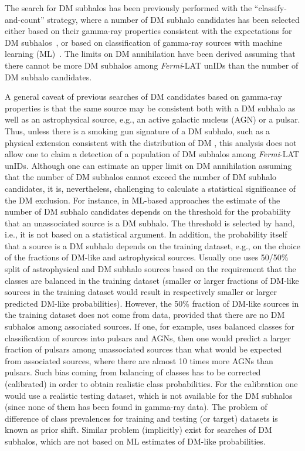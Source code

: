 \documentclass[12pt, a4paper]{article}
\newcommand{\Fermi}{{\sl Fermi}}
\newcommand{\DMsubhaloML}{\cite{2016ApJ...825...69M, 2019JCAP...11..045C, 2023JCAP...07..033B, 2023MNRAS.520.1348G}}
\newcommand{\DMsubhaloHand}{\cite{2010PhRvD..82f3501B, 2012A&A...538A..93Z, 2012ApJ...747..121A, 2012JCAP...11..050Z, 2012PhRvD..86d3504B, 2014PhRvD..89a6014B, 2015JCAP...12..035B, 2016JCAP...05..028S, 2017JCAP...04..018H, 2017PhRvD..96f3009C, 2019JCAP...07..020C, 2019JCAP...11..045C}}
\begin{document}
The search for DM subhalos has been previously performed with the ``classify-and-count'' strategy, where a number of DM subhalo candidates has been selected either based on their gamma-ray properties 
consistent with the expectations for DM subhalos~\DMsubhaloHand, or based on classification of gamma-ray sources with machine learning (ML)~\DMsubhaloML.
The limits on DM annihilation have been derived assuming that there cannot be more DM subhalos among \Fermi-LAT unIDs than the number of DM subhalo candidates.

A general caveat of previous searches of DM candidates based on gamma-ray properties is that the same source may be consistent both with a DM subhalo as well as an astrophysical source, e.g., an active galactic nucleus (AGN) or a pulsar.
Thus, unless there is a smoking gun signature of a DM subhalo, such as a physical extension consistent with the distribution of DM 
\cite{2014PhRvD..89a6014B, 2015JCAP...12..035B, 2017PhRvD..96f3009C, 2022PhRvD.105h3006C, 2019JCAP...11..045C}, this analysis does not allow one to claim a detection of a population of DM subhalos among \Fermi-LAT unIDs.
Although one can estimate an upper limit on DM annihilation assuming that the number of DM subhalos cannot exceed the number of DM subhalo candidates,
it is, nevertheless, challenging to calculate a statistical significance of the DM exclusion.
For instance, in ML-based approaches the estimate of the number of DM subhalo candidates depends on the threshold for the probability that an unassociated source is a DM subhalo.
The threshold is selected by hand, i.e., it is not based on a statistical argument. In addition, the probability itself that a source is a DM subhalo depends on the training dataset, e.g., on the choice of the fractions of DM-like and astrophysical sources. Usually one uses 50/50\% split of astrophysical and DM subhalo sources based on the requirement that the classes are balanced in the training dataset (smaller or larger fractions of DM-like sources in the training dataset would result in respectively smaller or larger predicted DM-like probabilities). However, the 50\% fraction of DM-like sources in the training dataset does not come from data, provided that there are no DM subhalos among associated sources. If one, for example, uses balanced classes for classification of sources into pulsars and AGNs, then one would predict a larger fraction of pulsars among unassociated sources
than what would be expected from associated sources, where there are almost 10 times more AGNs than pulsars. Such bias coming from balancing of classes has to be corrected (calibrated) in order to obtain realistic class probabilities.
For the calibration one would use a realistic testing dataset, which is not available for the DM subhalos (since none of them has been found in gamma-ray data).
The problem of difference of class prevalences for training and testing (or target) datasets is known as prior shift.
Similar problem (implicitly) exist for searches of DM subhalos, which are not based on ML estimates of DM-like probabilities.
\end{document}
